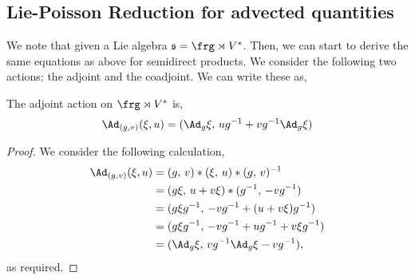 \subsection{Lie-Poisson Reduction for advected quantities}
We note that given a Lie algebra $\mathfrak{s} = \frg \rtimes V^*$. Then, we can start to derive the same equations as above for semidirect products. We consider the following two actions: the adjoint and the coadjoint. We can write these as,
\begin{nprop}
  The adjoint action on $\frg \rtimes V^*$ is,
  $$ \Ad_{(g,v)}(\xi, u) = (\Ad_g\xi,\,  ug^{-1} + vg^{-1}\Ad_g\xi) $$
\end{nprop}
\begin{proof}
  We consider the following calculation,
  \begin{align*}
    \Ad_{(g,v)}(\xi, u) &= (g,\, v) * (\xi,\, u) * (g,\, v)^{-1} \\
    &= (g\xi,\, u + v\xi) * (g^{-1},\, -vg^{-1}) \\
    &= (g\xi g^{-1},\, -vg^{-1} + (u + v\xi)g^{-1}) \\
    &= (g\xi g^{-1},\, -vg^{-1} + ug^{-1} + v\xi g^{-1}) \\
    &= (\Ad_g \xi,\, vg^{-1}\Ad_g \xi - vg^{-1}),
  \end{align*}
  as required.
\end{proof}

